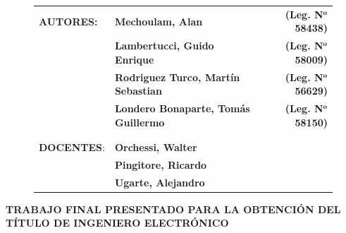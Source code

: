\begin{titlepage}
\begin{figure}[H]
\begin{adjustwidth}{-1cm}{}
\begin{tabular}{llr} 
	\textbf{AUTORES:} & \textbf{Mechoulam, Alan}  &  \textbf{(Leg. N}$\mathbf{^o}$ \textbf{58438)}\\
	 & \textbf{Lambertucci, Guido Enrique} & \textbf{(Leg. N}$\mathbf{^o}$ \textbf{58009)} \\
	 & \textbf{Rodriguez Turco, Martín Sebastian} & \textbf{(Leg. N}$\mathbf{^o}$ \textbf{56629)} \\
	 & \textbf{Londero Bonaparte, Tomás Guillermo} & \textbf{(Leg. N}$\mathbf{^o}$ \textbf{58150)} \\
 &  & \\
 &  & \\
	\textbf{DOCENTES}: & \textbf{Orchessi, Walter} & \\
	 & \textbf{Pingitore, Ricardo} & \\
	 & \textbf{Ugarte, Alejandro} & \\
\end{tabular}
\end{adjustwidth}
\end{figure}

\vspace*{0.5cm}
{\noindent \textbf{TRABAJO FINAL PRESENTADO PARA LA OBTENCIÓN DEL TÍTULO DE INGENIERO ELECTRÓNICO}}
\vspace*{1.5cm}


\end{titlepage}
